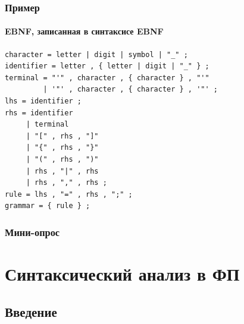 \documentclass[xetex,mathserif,serif]{beamer}
\begin{document}
    \begin{frame}[fragile]
        \frametitle{Пример}
        \framesubtitle{EBNF, записанная в синтаксисе EBNF}
        \begin{footnotesize}
            \begin{verbatim}
character = letter | digit | symbol | "_" ;
identifier = letter , { letter | digit | "_" } ;
terminal = "'" , character , { character } , "'" 
         | '"' , character , { character } , '"' ;
lhs = identifier ;
rhs = identifier
     | terminal
     | "[" , rhs , "]"
     | "{" , rhs , "}"
     | "(" , rhs , ")"
     | rhs , "|" , rhs
     | rhs , "," , rhs ;
rule = lhs , "=" , rhs , ";" ;
grammar = { rule } ;
            \end{verbatim}
        \end{footnotesize}
    \end{frame}

    \begin{frame}
        \frametitle{Мини-опрос}
    \end{frame}

    \section{Синтаксический анализ в ФП}

    \subsection{Введение}
\end{document}
